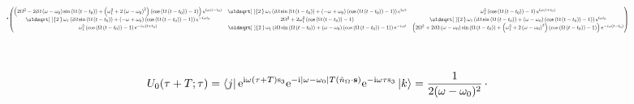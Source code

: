 \documentclass[10pt,a4paper]{article}
\renewcommand*{\sqrt}[2][\ ]{\oldsqrt[#1]{#2\,}\,}
\newcommand{\const}[1]{\text{#1}}
\newcommand{\mat}[1]{
    \begin{pmatrix}
        #1
    \end{pmatrix}
}
\newcommand{\bra}[1]{\left< #1 \right|}
\newcommand{\ket}[1]{\left| #1 \right>}
\newcommand{\e}[1]{\const{e}^{#1}}
\renewcommand{\i}{\const{i}}
\begin{document}
\begin{gather*}
    \cdot \scalebox{0.48}{$\mat{\left(2 \Omega^{2} - 2 i \Omega \left(\omega - \omega_{0}\right) \sin{\left(\Omega \left(t - t_{0}\right) \right)} + \left(\omega_{1}^{2} + 2 \left(\omega - \omega_{0}\right)^{2}\right) \left(\cos{\left(\Omega \left(t - t_{0}\right) \right)} - 1\right)\right) e^{i \omega \left(t - t_{0}\right)} & \sqrt{2} \omega_{1} \left(i \Omega \sin{\left(\Omega \left(t - t_{0}\right) \right)} + \left(- \omega + \omega_{0}\right) \left(\cos{\left(\Omega \left(t - t_{0}\right) \right)} - 1\right)\right) e^{i \omega t} & \omega_{1}^{2} \left(\cos{\left(\Omega \left(t - t_{0}\right) \right)} - 1\right) e^{i \omega \left(t + t_{0}\right)}\\\sqrt{2} \omega_{1} \left(i \Omega \sin{\left(\Omega \left(t - t_{0}\right) \right)} + \left(- \omega + \omega_{0}\right) \left(\cos{\left(\Omega \left(t - t_{0}\right) \right)} - 1\right)\right) e^{- i \omega t_{0}} & 2 \Omega^{2} + 2 \omega_{1}^{2} \left(\cos{\left(\Omega \left(t - t_{0}\right) \right)} - 1\right) & \sqrt{2} \omega_{1} \left(i \Omega \sin{\left(\Omega \left(t - t_{0}\right) \right)} + \left(\omega - \omega_{0}\right) \left(\cos{\left(\Omega \left(t - t_{0}\right) \right)} - 1\right)\right) e^{i \omega t_{0}}\\\omega_{1}^{2} \left(\cos{\left(\Omega \left(t - t_{0}\right) \right)} - 1\right) e^{- i \omega \left(t + t_{0}\right)} & \sqrt{2} \omega_{1} \left(i \Omega \sin{\left(\Omega \left(t - t_{0}\right) \right)} + \left(\omega - \omega_{0}\right) \left(\cos{\left(\Omega \left(t - t_{0}\right) \right)} - 1\right)\right) e^{- i \omega t} & \left(2 \Omega^{2} + 2 i \Omega \left(\omega - \omega_{0}\right) \sin{\left(\Omega \left(t - t_{0}\right) \right)} + \left(\omega_{1}^{2} + 2 \left(\omega - \omega_{0}\right)^{2}\right) \left(\cos{\left(\Omega \left(t - t_{0}\right) \right)} - 1\right)\right) e^{- i \omega \left(t - t_{0}\right)}}$}
    \\
    \\
    \\
    U_0(\tau + T; \tau) =
    \bra{j}
    \e{\i\omega (\tau + T) \const{s}_3}
    \e{-\i |\omega - \omega_0| T \left(\hat{n}_\Omega \cdot \mathbf{s}\right)}
    \e{-\i\omega \tau \const{s}_3}
    \ket{k} =
    \frac{1}{2 (\omega - \omega_0)^2} \,\cdot \\[5pt]

\end{gather*}
\end{document}
